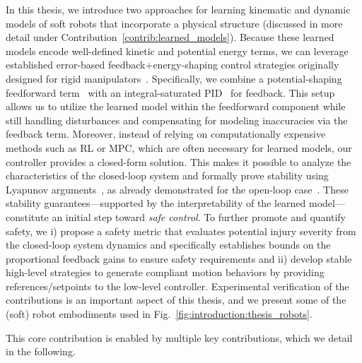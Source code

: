 In this thesis, we introduce two approaches for learning kinematic and dynamic models of soft robots that incorporate a physical structure (discussed in more detail under Contribution~\ref{contrib:learned_models}). Because these learned models encode well-defined kinetic and potential energy terms, we can leverage established error-based feedback+energy-shaping control strategies originally designed for rigid manipulators~\citep{kelly1995tuning, kelly1996class, kelly1998global, sciavicco2012modelling}. Specifically, we combine a potential-shaping feedforward term~\citep{della2023model} with an integral-saturated PID~\citep{pustina2022p} for feedback. This setup allows us to utilize the learned model within the feedforward component while still handling disturbances and compensating for modeling inaccuracies via the feedback term.
% 
Moreover, instead of relying on computationally expensive methods such as \gls{RL} or \gls{MPC}, which are often necessary for learned models, our controller provides a closed-form solution. This makes it possible to analyze the characteristics of the closed-loop system and formally prove stability using Lyapunov arguments~\citep{khalil2002nonlinear}, as already demonstrated for the open-loop case~\citep{stolzle2024input}. These stability guarantees—supported by the interpretability of the learned model—constitute an initial step toward \emph{safe control}.
% 
To further promote and quantify safety, we i) propose a safety metric that evaluates potential injury severity from the closed-loop system dynamics and specifically establishes bounds on the proportional feedback gains to ensure safety requirements and ii) develop stable high-level strategies to generate compliant motion behaviors by providing references/setpoints to the low-level controller.
Experimental verification of the contributions is an important aspect of this thesis, and we present some of the (soft) robot embodiments used in Fig.~\ref{fig:introduction:thesis_robots}.

This core contribution is enabled by multiple key contributions, which we detail in the following.

